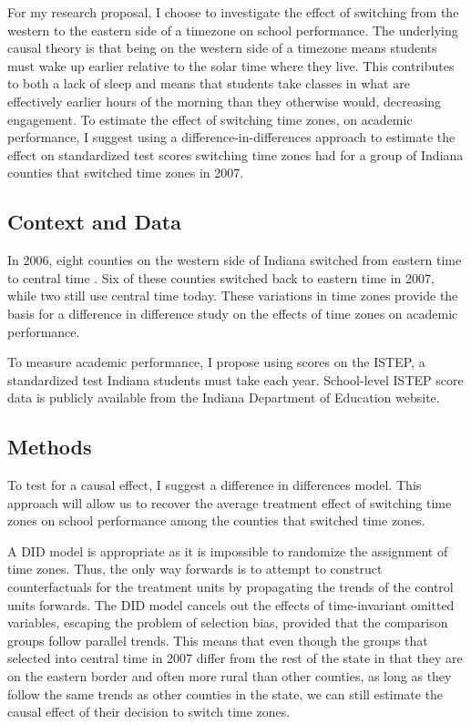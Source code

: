 \documentclass{article}\usepackage[]{graphicx}\usepackage[]{color}
\begin{document}
For my research proposal, I choose to investigate the effect of switching from the western to the eastern side of a timezone on school performance.
The underlying causal theory is that being on the western side of a timezone means students must wake up earlier relative to the solar time where they live.
This contributes to both a lack of sleep and means that students take classes in what are effectively earlier hours of the morning than they otherwise would, decreasing engagement.
To estimate the effect of switching time zones, on academic performance, I suggest using a difference-in-differences approach to estimate the effect on standardized test scores switching time zones had for a group of Indiana counties that switched time zones in 2007.

\subsection{Context and Data}

In 2006, eight counties on the western side of Indiana switched from eastern time to central time \parencite{tzchanges}.
Six of these counties switched back to eastern time in 2007, while two still use central time today.
These variations in time zones provide the basis for a difference in difference study on the effects of time zones on academic performance.

To measure academic performance, I propose using scores on the ISTEP, a standardized test Indiana students must take each year. School-level ISTEP score data is publicly available from the Indiana Department of Education website.

\subsection{Methods}
To test for a causal effect, I suggest a difference in differences model. This approach will allow us to recover the average treatment effect of switching time zones on school performance among the counties that switched time zones.

A DID model is appropriate as it is impossible to randomize the assignment of time zones. Thus, the only way forwards is to attempt to construct counterfactuals for the treatment units by propagating the trends of the control units forwards.
The DID model cancels out the effects of time-invariant omitted variables, escaping the problem of selection bias, provided that the comparison groups follow parallel trends.
This means that even though the groups that selected into central time in 2007 differ from the rest of the state in that they are on the eastern border and often more rural than other counties, as long as they follow the same trends as other counties in the state, we can still estimate the causal effect of their decision to switch time zones.
\end{document}
